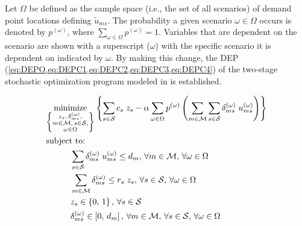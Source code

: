 \documentclass[12pt,dvipsnames]{report}
\begin{document}
Let $\Omega$ be defined as the sample space (i.e., the set of all scenarios) of demand point locations defining $\tilde{u}_{ms}$.  The probability a given scenario $\omega \in \Omega$ occurs is denoted by $p^{(\omega)}$, where $\sum_{\omega \in \Omega} p^{(\omega)} = 1$.  Variables that are dependent on the scenario are shown with a superscript ($\omega$) with the specific scenario it is dependent on indicated by $\omega$.  By making this change, the DEP (\cref{eq:DEPO,eq:DEPC1,eq:DEPC2,eq:DEPC3,eq:DEPC4}) of the two-stage stochastic optimization program modeled in  is established.

\begin{tcolorbox}[floatplacement = !ht, float, title = Deterministic Equivalent Program (DEP) of \Cref{eq:SOPS1O,eq:SOPS1C1,eq:SOPS2O,eq:SOPS2C1,eq:SOPS2C2,eq:SOPS2C3,eq:SOPS2C4}]
\begin{align}
& \underset{\left\{ \substack{
	z_s,\, \delta_{ms}^{\left( \omega \right)},\\
	m \in \mathcal{M},\, s \in \mathcal{S},\\
	\omega \in \Omega} \right\}} {\text{minimize}}
\left\{ \sum_{s \in \mathcal{S}} c_s \; z_s - \alpha \sum_{\omega \in \Omega} p^{\left( \omega \right)} \left( \sum_{m \in \mathcal{M}} \sum_{s \in \mathcal{S}} \delta_{ms}^{\left( \omega \right)} \; u_{ms}^{\left( \omega \right)} \right) \right\} \label{eq:DEPO}\\
& \text{subject to:} \nonumber \\
& \hspace{0.4in} \sum_{s \in \mathcal{S}} \delta_{ms}^{\left( \omega \right)} \; u_{ms}^{\left( \omega \right)} \leq d_m,\, \forall m \in \mathcal{M},\, \forall \omega \in \Omega \label{eq:DEPC1}\\
& \hspace{0.4in} \sum_{m \in \mathcal{M}} \delta_{ms}^{\left( \omega \right)} \leq r_s \; z_s,\, \forall s \in \mathcal{S},\, \forall \omega \in \Omega \label{eq:DEPC2}\\
& \hspace{0.4in} z_s \in \left\{ 0,\, 1 \right\},\, \forall s \in \mathcal{S} \label{eq:DEPC3}\\
& \hspace{0.4in} \delta_{ms}^{\left( \omega \right)} \in \left[ 0,\, d_m \right],\, \forall m \in \mathcal{M},\, \forall s \in \mathcal{S},\, \forall \omega \in \Omega \label{eq:DEPC4}
\end{align}
\end{tcolorbox}
\end{document}
